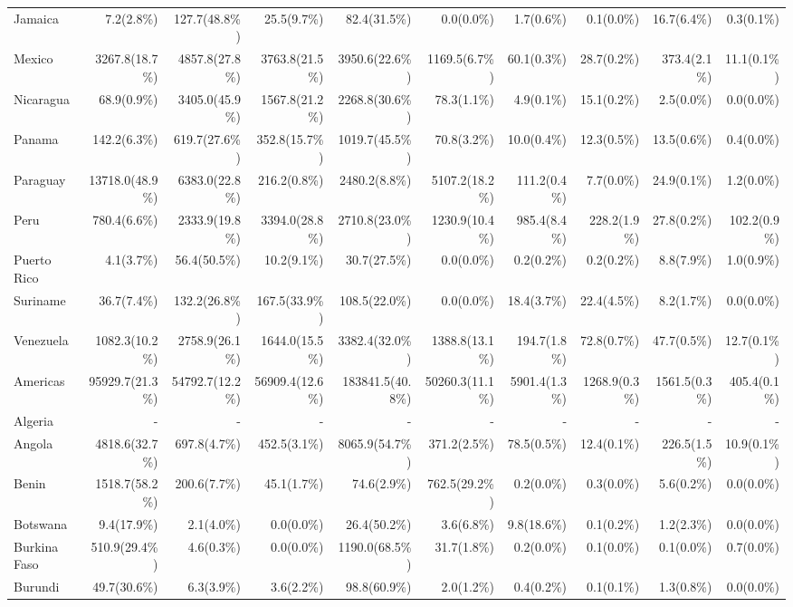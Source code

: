 \begin{scriptsize}
\begin{landscape}
\begin{center}
\begin{longtable}[ht]{lrrrrrrrrr}
			Jamaica&7.2(2.8\%)&127.7(48.8\%)&25.5(9.7\%)&82.4(31.5\%)&0.0(0.0\%)&1.7(0.6\%)&0.1(0.0\%)&16.7(6.4\%)&0.3(0.1\%)\\
			Mexico&3267.8(18.7\%)&4857.8(27.8\%)&3763.8(21.5\%)&3950.6(22.6\%)&1169.5(6.7\%)&60.1(0.3\%)&28.7(0.2\%)&373.4(2.1\%)&11.1(0.1\%)\\
			Nicaragua&68.9(0.9\%)&3405.0(45.9\%)&1567.8(21.2\%)&2268.8(30.6\%)&78.3(1.1\%)&4.9(0.1\%)&15.1(0.2\%)&2.5(0.0\%)&0.0(0.0\%)\\
			Panama&142.2(6.3\%)&619.7(27.6\%)&352.8(15.7\%)&1019.7(45.5\%)&70.8(3.2\%)&10.0(0.4\%)&12.3(0.5\%)&13.5(0.6\%)&0.4(0.0\%)\\
			Paraguay&13718.0(48.9\%)&6383.0(22.8\%)&216.2(0.8\%)&2480.2(8.8\%)&5107.2(18.2\%)&111.2(0.4\%)&7.7(0.0\%)&24.9(0.1\%)&1.2(0.0\%)\\
			Peru&780.4(6.6\%)&2333.9(19.8\%)&3394.0(28.8\%)&2710.8(23.0\%)&1230.9(10.4\%)&985.4(8.4\%)&228.2(1.9\%)&27.8(0.2\%)&102.2(0.9\%)\\
			Puerto Rico&4.1(3.7\%)&56.4(50.5\%)&10.2(9.1\%)&30.7(27.5\%)&0.0(0.0\%)&0.2(0.2\%)&0.2(0.2\%)&8.8(7.9\%)&1.0(0.9\%)\\
			Suriname&36.7(7.4\%)&132.2(26.8\%)&167.5(33.9\%)&108.5(22.0\%)&0.0(0.0\%)&18.4(3.7\%)&22.4(4.5\%)&8.2(1.7\%)&0.0(0.0\%)\\
			Venezuela&1082.3(10.2\%)&2758.9(26.1\%)&1644.0(15.5\%)&3382.4(32.0\%)&1388.8(13.1\%)&194.7(1.8\%)&72.8(0.7\%)&47.7(0.5\%)&12.7(0.1\%)\\\hline
			Americas&95929.7(21.3\%)&54792.7(12.2\%)&56909.4(12.6\%)&183841.5(40.8\%)&50260.3(11.1\%)&5901.4(1.3\%)&1268.9(0.3\%)&1561.5(0.3\%)&405.4(0.1\%)\\\hline
			Algeria&-&-&-&-&-&-&-&-&-\\
			Angola&4818.6(32.7\%)&697.8(4.7\%)&452.5(3.1\%)&8065.9(54.7\%)&371.2(2.5\%)&78.5(0.5\%)&12.4(0.1\%)&226.5(1.5\%)&10.9(0.1\%)\\
			Benin&1518.7(58.2\%)&200.6(7.7\%)&45.1(1.7\%)&74.6(2.9\%)&762.5(29.2\%)&0.2(0.0\%)&0.3(0.0\%)&5.6(0.2\%)&0.0(0.0\%)\\
			Botswana&9.4(17.9\%)&2.1(4.0\%)&0.0(0.0\%)&26.4(50.2\%)&3.6(6.8\%)&9.8(18.6\%)&0.1(0.2\%)&1.2(2.3\%)&0.0(0.0\%)\\
			Burkina Faso&510.9(29.4\%)&4.6(0.3\%)&0.0(0.0\%)&1190.0(68.5\%)&31.7(1.8\%)&0.2(0.0\%)&0.1(0.0\%)&0.1(0.0\%)&0.7(0.0\%)\\
			Burundi&49.7(30.6\%)&6.3(3.9\%)&3.6(2.2\%)&98.8(60.9\%)&2.0(1.2\%)&0.4(0.2\%)&0.1(0.1\%)&1.3(0.8\%)&0.0(0.0\%)\\

\end{longtable}
\end{center}
\end{landscape}
\end{scriptsize}
